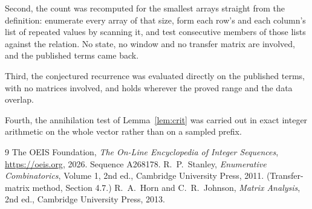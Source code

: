 \documentclass[11pt,a4paper]{article}
\theoremstyle{plain}
\theoremstyle{definition}
\begin{document}
Second, the count was recomputed for the smallest arrays straight from the definition:
enumerate every array of that size, form each row's and each column's list of repeated values
by scanning it, and test consecutive members of those lists against the relation. No state, no
window and no transfer matrix are involved, and the published terms came back.

Third, the conjectured recurrence was evaluated directly on the published terms, with no
matrices involved, and holds wherever the proved range and the data overlap.

Fourth, the annihilation test of Lemma~\ref{lem:crit} was carried out in exact integer
arithmetic on the whole vector rather than on a sampled prefix.

\begin{thebibliography}{9}
 The OEIS Foundation, \emph{The On-Line Encyclopedia of Integer
Sequences}, \url{https://oeis.org}, 2026. Sequence A268178.
 R.~P.~Stanley, \emph{Enumerative Combinatorics}, Volume 1, 2nd ed.,
Cambridge University Press, 2011. (Transfer-matrix method, Section 4.7.)
 R.~A.~Horn and C.~R.~Johnson, \emph{Matrix Analysis}, 2nd ed., Cambridge
University Press, 2013.
\end{thebibliography}
\end{document}
